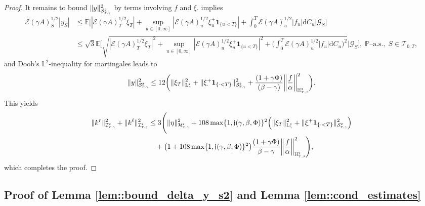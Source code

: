 \documentclass[10pt]{article} %
\newcommand\cE{\mathcal E}
\newcommand\cG{\mathcal G}
\newcommand\cH{\mathcal H}
\newcommand\cI{\mathcal I}
\newcommand\cS{\mathcal S}
\newcommand\cT{\mathcal T}
\newcommand{\smalltext}[1]{\text{\fontsize{4}{4}\selectfont$#1$}}
\def \E{\mathbb{E}}
\def \H{\mathbb{H}}
\def \L{\mathbb{L}}
\def \P{\mathbb{P}}
\newcommand{\1}{\mathbf{1}}
\def\d{\mathrm{d}}
\begin{document}
\begin{proof}
	It remains to bound $\|y\|^2_{\cS^\smalltext{2}_{\smalltext{T}\smalltext{,}\smalltext{\gamma}}}$ by terms involving $f$ and $\xi$.  implies
	\begin{align*}
		\cE(\gamma A)^{1/2}_S |y_S| 
		&\leq \E\bigg[ |\cE(\gamma A)^{1/2}_T\xi_T| + \sup_{u \in [0,\infty]}|\cE(\gamma A)^{1/2}_u \xi^+_u\mathbf{1}_{\{u < T\}}| + \int_0^T\cE(\gamma A)^{1/2}_u |f_u|\d C_u \bigg| \cG_S\bigg] \\
		&\leq \sqrt{3}\E\Bigg[ \sqrt{|\cE(\gamma A)^{1/2}_T\xi_T|^2 + \sup_{u \in [0,\infty]}|\cE(\gamma A)^{1/2}_u \xi^+_u\mathbf{1}_{\{u < T\}}|^2 + \bigg(\int_0^T\cE(\gamma A)^{1/2}_u |f_u|\d C_u\bigg)^2} \Bigg| \cG_S\Bigg], \; \text{$\P$--a.s.}, \; S \in \cT_{0,T},
	\end{align*}
	and Doob's $\L^2$-inequality for martingales leads to
	\begin{equation*}
		\|y\|^2_{\cS^\smalltext{2}_{\smalltext{T}\smalltext{,}\smalltext{\gamma}}} \leq 12 \bigg( \|\xi_T\|^2_{\L^\smalltext{2}_\smalltext{\gamma}} + \|\xi^+_\cdot\mathbf{1}_{\{\cdot < T\}}\|^2_{\cS^\smalltext{2}_{\smalltext{T}\smalltext{,}\smalltext{\gamma}}} + \frac{(1+\gamma\Phi)}{(\beta-\gamma)}\bigg\|\frac{f}{\alpha}\bigg\|^2_{\H^\smalltext{2}_{\smalltext{T}\smalltext{,}\smalltext{\beta}}} \bigg).
	\end{equation*}
	This yields
	\begin{align*}
		\|k^r\|^2_{\cI^\smalltext{2}_{\smalltext{T}\smalltext{,}\smalltext{\gamma}}} + \|k^\ell\|^2_{\cI^\smalltext{2}_{\smalltext{T}\smalltext{,}\smalltext{\gamma}}} 
		&\leq 3 \Bigg( \|\eta\|^2_{\cH^\smalltext{2}_{\smalltext{T}\smalltext{,}\smalltext{\gamma}}} + 108 \max\{1, \mathfrak{j}(\gamma,\beta,\Phi)\}^2\Big(\|\xi_T\|^2_{\L^\smalltext{2}_\smalltext{\gamma}} + \|\xi^+_\cdot\mathbf{1}_{\{\cdot < T\}}\|^2_{\cS^\smalltext{2}_{\smalltext{T}\smalltext{,}\smalltext{\gamma}}} \Big) \\
		&\quad + \big(1+ 108 \max\{1, \mathfrak{j}(\gamma,\beta,\Phi)\}^2\big)\frac{(1+\gamma\Phi)}{\beta-\gamma}\bigg\|\frac{f}{\alpha}\bigg\|^2_{\H^\smalltext{2}_{\smalltext{T}\smalltext{,}\smalltext{\beta}}} \Bigg),
	\end{align*}
	which completes the proof.
\end{proof}



\subsection{Proof of Lemma \ref{lem::bound_delta_y_s2} and Lemma \ref{lem::cond_estimates}}\label{subsec::proofs_tech_lemmas}
\end{document}
